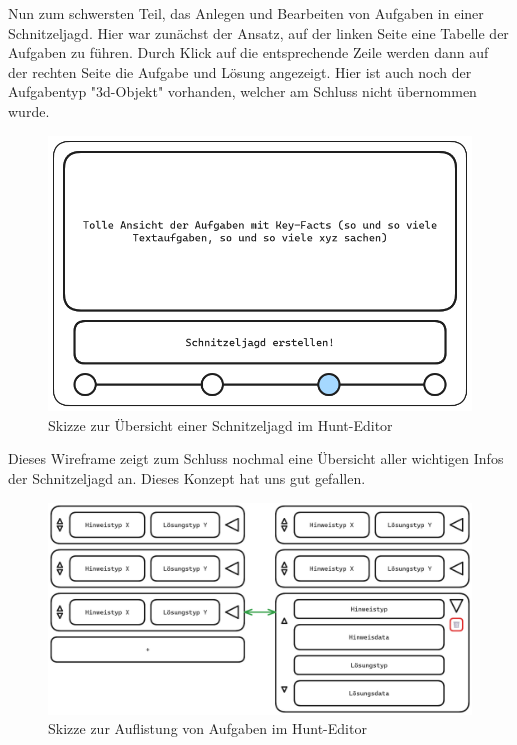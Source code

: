 Nun zum schwersten Teil, das Anlegen und Bearbeiten von Aufgaben in einer Schnitzeljagd. Hier war zunächst der Ansatz, auf der linken Seite eine Tabelle der Aufgaben zu führen. Durch Klick auf die entsprechende Zeile werden dann auf der rechten Seite die Aufgabe und Lösung angezeigt. Hier ist auch noch der Aufgabentyp "3d-Objekt" vorhanden, welcher am Schluss nicht übernommen wurde. 

\begin{figure}[H]
  \centering
  \includegraphics[width=1\textwidth]{images/wireframing/PrAr_Scavhunt_Wireframing-2.4.png}
  \caption{Skizze zur Übersicht einer Schnitzeljagd im Hunt-Editor}
  \label{fig:wireframing-frontend-hunt-editor-6}
\end{figure}

Dieses Wireframe zeigt zum Schluss nochmal eine Übersicht aller wichtigen Infos der Schnitzeljagd an. Dieses Konzept hat uns gut gefallen. 

\begin{figure}[H]
  \centering
  \includegraphics[width=1\textwidth]{images/wireframing/PrAr_Scavhunt_Wireframing-3.png}
  \caption{Skizze zur Auflistung von Aufgaben im Hunt-Editor}
  \label{fig:wireframing-frontend-hunt-editor-7}
\end{figure}

